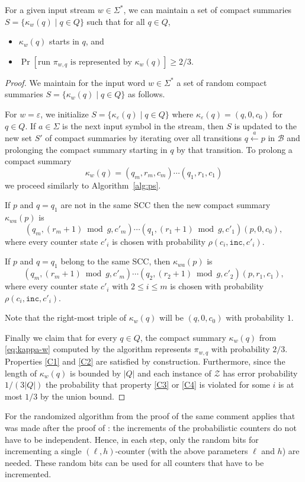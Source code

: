 \documentclass{theoretics}
\newcommand{\B}{\mathcal{B}}
\newcommand{\BZ}{\mathcal{Z}}
\newcommand{\eps}{\varepsilon}
\renewcommand{\geq}{\geqslant}
\renewcommand{\leq}{\leqslant}
\renewcommand{\le}{\leq}
\begin{document}
\begin{proposition}
\label{prop:ps-alg}
For a given input stream $w \in \Sigma^*$, we can maintain a set of compact summaries $S = \{\kappa_w(q) \mid q \in Q \}$
such that for all $q \in Q$,
\begin{itemize}
    \item $\kappa_w(q)$ starts in $q$, and 
    \item $\Pr[\text{run $\pi_{w,q}$ is represented by $\kappa_w(q)$}] \geq 2/3$.
\end{itemize}
\end{proposition}

\begin{proof}
We maintain for the input word $w \in \Sigma^*$ a set of
random compact summaries $S = \{\kappa_w(q) \mid q \in Q \}$ as follows.

For $w = \eps$, we initialize $S = \{\kappa_{\eps}(q) \mid q \in Q\}$
where $\kappa_{\eps}(q) = (q,0,c_0)$ for $q \in Q$.
If $a \in \Sigma$ is the next input symbol in the stream, then $S$ is updated to the new set $S'$ of compact summaries
by iterating over all transitions $q \xleftarrow{a} p$ in $\B$ and prolonging the compact summary starting in $q$
by that transition.
To prolong a compact summary 
\begin{equation} \label{eq:kappa-w}
\kappa_{w}(q) = (q_m, r_m, c_m) \cdots (q_1, r_1, c_1) 
\end{equation}
we proceed similarly to Algorithm~\ref{alg:ps}.


If $p$ and $q = q_1$ are not in the same SCC then the new compact summary $\kappa_{wa}(p)$ is
\[
	 (q_m,(r_m+1) \bmod g, c'_m) \cdots (q_1,(r_1+1) \bmod g, c'_1) (p, 0, c_0),
\]
where every counter state $c'_i$ is chosen with probability $\rho(c_i,\mathtt{inc}, c'_i)$.

If $p$ and $q = q_1$ belong to the same SCC, then $\kappa_{wa}(p)$ is
\[
	(q_m,(r_m+1) \bmod g, c'_m) \cdots (q_2,(r_2+1) \bmod g, c'_2) (p,r_1, c_1),
\]
where every counter state $c'_i$ with $2 \le i \le m$ is chosen with probability $\rho(c_i,\mathtt{inc}, c'_i)$.

Note that the right-most triple of $\kappa_{w}(q)$ will be $(q,0,c_0)$ with probability $1$.

Finally we claim that for every $q \in Q$, the compact summary $\kappa_w(q)$ from \eqref{eq:kappa-w} computed by the algorithm
represents $\pi_{w,q}$ with probability $2/3$. 
Properties \ref{C1} and \ref{C2} are satisfied by construction.
Furthermore, since the length of $\kappa_w(q)$ is bounded by $|Q|$
and each instance of $\BZ$ has error probability $1/(3|Q|)$
the probability that property \ref{C3} or \ref{C4} is violated for some $i$
is at most $1/3$ by the union bound.
\end{proof}
For the randomized algorithm from the proof of  the same comment applies that was made after the proof of : 
the increments of the probabilistic counters do not have to be independent. 
Hence, in each step, only the random bits for incrementing a single $(\ell, h)$-counter (with the above parameters $\ell$ and $h$)
are needed. These random bits can be used for all counters that have to be incremented. 
\end{document}
